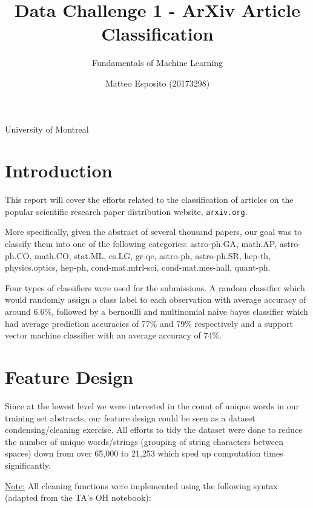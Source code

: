 \documentclass[a4paper,12pt]{article}
\title{\textbf{Data Challenge 1 - ArXiv Article Classification}}
\author{Fundamentals of Machine Learning}
\date{Matteo Esposito (20173298)}
\def\code#1{\texttt{#1}}
\begin{document}
\begin{titlingpage}
  \maketitle
  \centering
  \vfill
  {\large{University of Montreal}}\par
  {\large{}}
\end{titlingpage}

\newpage

\section{Introduction}

This report will cover the efforts related to the classification of articles on the popular scientific research paper distribution website, \code{arxiv.org}. 

\medskip

More specifically, given the abstract of several thousand papers, our goal was to classify them into one of the following categories: astro-ph.GA, math.AP, astro-ph.CO, math.CO, stat.ML, cs.LG, gr-qc, astro-ph, astro-ph.SR, hep-th, physics.optics, hep-ph, cond-mat.mtrl-sci, cond-mat.mes-hall, quant-ph.

\medskip

Four types of classifiers were used for the submissions. A random classifier which would randomly assign a class label to each observation with average accuracy of around 6.6\%, followed by a bernoulli and multinomial naive bayes classifier which had average prediction accuracies of 77\% and 79\% respectively and a support vector machine classifier with an average accuracy of 74\%.

\section{Feature Design}

Since at the lowest level we were interested in the count of unique words in our training set abstracts, our feature design could be seen as a dataset condensing/cleaning exercise. All efforts to tidy the dataset were done to reduce the number of unique words/strings (grouping of string characters between spaces) down from over 65,000 to 21,253 which sped up computation times significantly. 

\medskip

\underline{Note:} All cleaning functions were implemented using the following syntax (adapted from the TA's OH notebook): 
\end{document}
